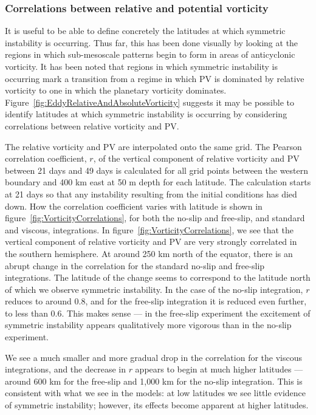     \subsubsection{Correlations between relative and potential vorticity}
    It is useful to be able to define concretely the latitudes at which symmetric instability is occurring. Thus far, this has been done visually by looking at the regions in which sub-mesoscale patterns begin to form in areas of anticyclonic vorticity. It has been noted that regions in which symmetric instability is occurring mark a transition from a regime in which PV is dominated by relative vorticity to one in which the planetary vorticity dominates. Figure~\ref{fig:EddyRelativeAndAbsoluteVorticity} suggests it may be possible to identify latitudes at which symmetric instability is occurring by considering correlations between relative vorticity and PV.

    The relative vorticity and PV are interpolated onto the same grid. The Pearson correlation coefficient, $r$, of the vertical component of relative vorticity and PV between 21 days and 49 days is calculated for all grid points between the western boundary and 400 km east at 50 m depth for each latitude. The calculation starts at 21 days so that any instability resulting from the initial conditions has died down. How the correlation coefficient varies with latitude is shown in figure~\ref{fig:VorticityCorrelations}, for both the no-slip and free-slip, and standard and viscous, integrations.
    In figure~\ref{fig:VorticityCorrelations}, we see that the vertical component of relative vorticity and PV are very strongly correlated in the southern hemisphere. At around 250 km north of the equator, there is an abrupt change in the correlation for the standard no-slip and free-slip integrations. The latitude of the change seems to correspond to the latitude north of which we observe symmetric instability. In the case of the no-slip integration, $r$ reduces to around 0.8, and for the free-slip integration it is reduced even further, to less than 0.6. This makes sense --- in the free-slip experiment the excitement of symmetric instability appears qualitatively more vigorous than in the no-slip experiment.

    We see a much smaller and more gradual drop in the correlation for the viscous integrations, and the decrease in $r$ appears to begin at much higher latitudes --- around 600 km for the free-slip and 1,000 km for the no-slip integration. This is consistent with what we see in the models: at low latitudes we see little evidence of symmetric instability; however, its effects become apparent at higher latitudes.

